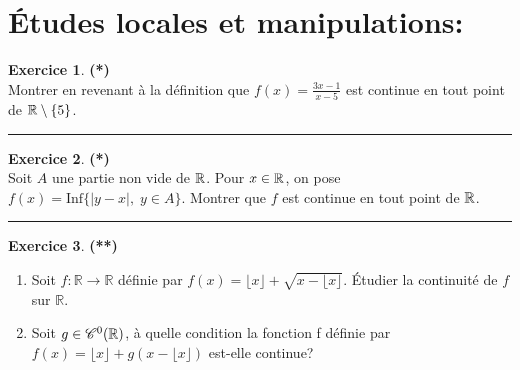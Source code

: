 \documentclass[a4paper,11pt]{article}
\theoremstyle{definition}
\newtheorem{exo}{Exercice} %
\begin{document}
 	
	

\noindent{}
\medskip







\begin{minipage}[t]{1\linewidth}
\section*{Études locales et manipulations:}
	
	\begin{minipage}[t]{0.48\linewidth}
		\raggedright

		\begin{exo}\textbf{(*)}\quad\\[0.2cm]
		Montrer en revenant à la définition que $f(x)=\frac{3x-1}{x-5}$ est continue en tout point de $\mathbb{R}\setminus\{5\}$.
		
		\centering
		\rule{1\linewidth}{0.6pt}
	\end{exo}

	\begin{exo}\textbf{(*)}\quad\\[0.2cm]
	Soit $A$ une partie non vide de $\mathbb{R}$. Pour $x\in\mathbb{R}$, on pose $f(x)=\mbox{Inf}\{|y-x|,\;y\in A\}$. Montrer que $f$ est continue en tout point de $\mathbb{R}$.
	
			\centering
	\rule{1\linewidth}{0.6pt}
	\end{exo}	
			
	\begin{exo}\textbf{(**)}\quad\\[0.2cm]
		\begin{enumerate}
			\item 	Soit $f:\mathbb R\to\mathbb R$ définie par $f(x)=\lfloor x\rfloor +\sqrt{x-\lfloor x\rfloor }$.
			\'Etudier la continuité de $f$ sur $\mathbb R$.
			\item Soit $g\in\mathscr{C}^0(\mathbb{R})$, à quelle condition la fonction f définie par $f(x)=\lfloor x\rfloor +g(x-\lfloor x\rfloor )$ est-elle continue?
		\end{enumerate}
	

\end{exo}
\end{minipage}
\end{minipage}
\end{document}
